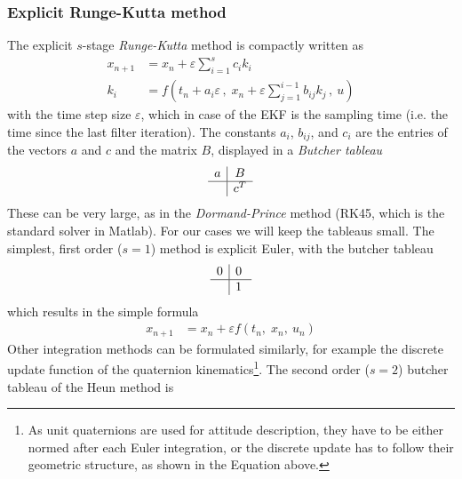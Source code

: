 \subsubsection{Explicit Runge-Kutta method}
The explicit $s$-stage \textit{Runge-Kutta} method is compactly written as \cite{griffiths2010}
\begin{align}
    x_{n+1} &= x_n + \varepsilon \sum_{i=1}^{s} c_i k_i
    \\
    k_i &= f \left( t_n + a_i \varepsilon \, , \; x_n + \varepsilon \sum_{j=1}^{i-1} b_{ij} k_j \, , \ u \right) 
\end{align}
with the time step size $\varepsilon$, which in case of the EKF is the sampling time (i.e. the time since the last filter iteration).
The constants $a_i$, $b_{ij}$, and $c_i$ are the entries of the vectors $a$ and $c$ and the matrix $B$, displayed in a \textit{Butcher tableau}
\begin{equation}
    \begin{array}{c|c}
        a & B \\
        \hline 
        & c^T
        \end{array}
    \label{eq:appendix_general_butcher}
\end{equation}
These can be very large, as in the \textit{Dormand-Prince} method (RK45, which is the standard solver in Matlab).
For our cases we will keep the tableaus small.
The simplest, first order ($s=1$) method is explicit Euler, with the butcher tableau \cite{griffiths2010}
\begin{equation}
    \begin{array}{c|cc}
        0 & 0 \;\\
        \hline 
        & 1 \;
        \end{array}
    \label{eq:appendix_euler_butcher}
\end{equation}
which results in the simple formula
\begin{align}
    x_{n+1} &= x_n + \varepsilon f \left( t_n, \; x_n, \ u_n \right)
\end{align}
Other integration methods can be formulated similarly, for example the discrete update function of the quaternion kinematics\footnote{As unit quaternions are used for attitude description, they have to be either normed after each Euler integration, or the discrete update has to follow their geometric structure, as shown in the Equation above.}. %
The second order ($s=2$) butcher tableau of the Heun method \cite{griffiths2010} is 
